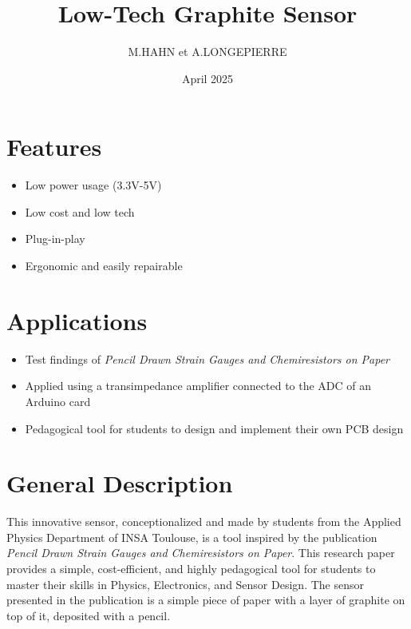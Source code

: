 \documentclass[10pt]{datasheet}
\title{Low-Tech Graphite Sensor}
\author{M.HAHN et A.LONGEPIERRE}
\date{April 2025}
\begin{document}
\maketitle


\section{Features}

\begin{itemize}
\item{Low power usage (3.3V-5V)}
\item{Low cost and low tech}
\item{Plug-in-play}
\item{Ergonomic and easily repairable}
\end{itemize}

\section{Applications}

\begin{itemize}
\item{Test findings of \it{Pencil Drawn Strain Gauges and Chemiresistors on Paper}\footnotemark{}}
\item{Applied using a transimpedance amplifier connected to the ADC of an Arduino card}
\item{Pedagogical tool for students to design and implement their own PCB design}
\end{itemize}

\section{General Description}
This innovative sensor, conceptionalized and made by students from the Applied Physics Department of INSA Toulouse, is a tool inspired by the publication 
\textit{Pencil Drawn Strain Gauges and Chemiresistors on Paper}\footnotemark[\value{footnote}]. This research paper provides a simple, cost-efficient, and highly pedagogical tool for students 
to master their skills in Physics, Electronics, and Sensor Design. The sensor presented in the publication is a simple piece of paper with a layer of graphite 
on top of it, deposited with a pencil. 
\end{document}
